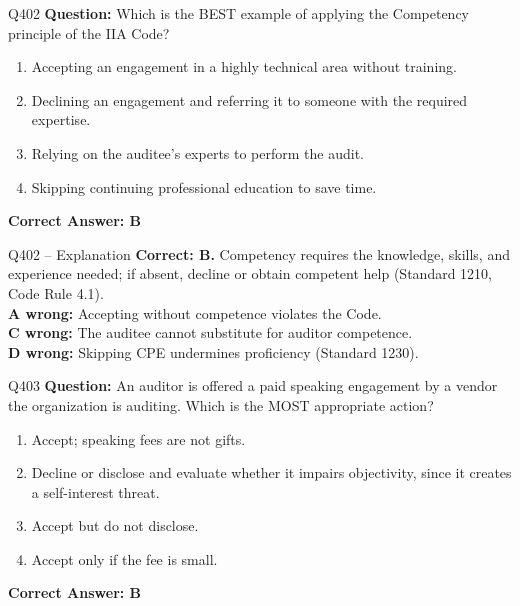 \documentclass[aspectratio=169,10pt]{beamer}
\begin{document}
	\begin{frame}[t]{Q402}
		\small
		\textbf{Question:} Which is the BEST example of applying the Competency principle of the IIA Code?
		\begin{enumerate}[label=\Alph*.,itemsep=1pt,topsep=2pt]
			\item Accepting an engagement in a highly technical area without training.
			\item Declining an engagement and referring it to someone with the required expertise.
			\item Relying on the auditee's experts to perform the audit.
			\item Skipping continuing professional education to save time.
		\end{enumerate}
		\vspace{4pt}
		\textbf{Correct Answer: B}
	\end{frame}
	
	\begin{frame}[t]{Q402 -- Explanation}
		\small
		\textbf{Correct: B.} Competency requires the knowledge, skills, and experience needed; if absent, decline or obtain competent help (Standard 1210, Code Rule 4.1). \\[4pt]
		\textbf{A wrong:} Accepting without competence violates the Code. \\[2pt]
		\textbf{C wrong:} The auditee cannot substitute for auditor competence. \\[2pt]
		\textbf{D wrong:} Skipping CPE undermines proficiency (Standard 1230).
	\end{frame}
	
	\begin{frame}[t]{Q403}
		\small
		\textbf{Question:} An auditor is offered a paid speaking engagement by a vendor the organization is auditing. Which is the MOST appropriate action?
		\begin{enumerate}[label=\Alph*.,itemsep=1pt,topsep=2pt]
			\item Accept; speaking fees are not gifts.
			\item Decline or disclose and evaluate whether it impairs objectivity, since it creates a self-interest threat.
			\item Accept but do not disclose.
			\item Accept only if the fee is small.
		\end{enumerate}
		\vspace{4pt}
		\textbf{Correct Answer: B}
	\end{frame}
	
\end{document}
